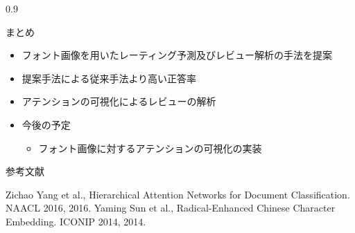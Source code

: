 \documentclass[unicode,10pt]{beamer}
\newlength{\mycolumnwidth}
\newcommand{\itemtitle}[1]{#1\\}
\begin{document}
\begin{frame}[t]
\begin{columns}[onlytextwidth,t]
\begin{column}{0.9\mycolumnwidth}
    \begin{block}{まとめ}
      \begin{itemize}
        \item フォント画像を用いたレーティング予測及びレビュー解析の手法を提案
        \item 提案手法による従来手法\cite{yang16}より高い正答率
        \item アテンションの可視化によるレビューの解析
        \item \itemtitle{今後の予定}
          \begin{itemize}
            \item フォント画像に対するアテンションの可視化の実装
          \end{itemize}
      \end{itemize}
    \end{block}

    参考文献
    
    \begin{thebibliography}{9}
        Zichao Yang et al.,
        Hierarchical Attention Networks for Document Classification.
        NAACL 2016, 2016.
        Yaming Sun et al.,
        Radical-Enhanced Chinese Character Embedding.
        ICONIP 2014, 2014.
    \end{thebibliography}
  \end{column}
\end{columns}

\end{frame}
\end{document}
